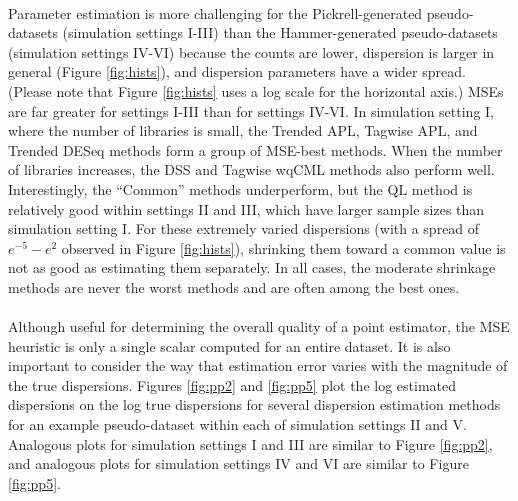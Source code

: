 \documentclass[10pt]{article}
\begin{document}
\paragraph{} \indent Parameter estimation is more challenging for the Pickrell-generated pseudo-datasets (simulation settings I-III) than the Hammer-generated pseudo-datasets (simulation settings IV-VI) because the counts are lower, dispersion is larger in general (Figure \ref{fig:hists}), and dispersion parameters have a wider spread. (Please note that Figure \ref{fig:hists} uses a log scale for the horizontal axis.) MSEs are far greater for settings I-III than for settings IV-VI. In simulation setting I, where the number of libraries is small, the Trended APL, Tagwise APL, and Trended DESeq methods form a group of MSE-best methods. When the number of libraries increases, the DSS and Tagwise wqCML methods also perform well. Interestingly, the ``Common'' methods underperform, but the QL method is relatively good within settings II and III, which have larger sample sizes than simulation setting I. For these extremely varied dispersions (with a spread of $e^{-5}-e^2$ observed in Figure \ref{fig:hists}), shrinking them toward a common value is not as good as estimating them separately. In all cases, the moderate shrinkage methods are never the worst methods and are often among the best ones.


\paragraph{} \indent Although useful for determining the overall quality of a point estimator, the MSE heuristic is only a single scalar computed for an entire dataset. It is also important to consider the way that estimation error varies with the magnitude of the true dispersions. Figures \ref{fig:pp2} and \ref{fig:pp5} plot the log estimated dispersions on the log true dispersions for several dispersion estimation methods for an example pseudo-dataset within each of simulation settings II and V. Analogous plots for simulation settings I and III are similar to Figure \ref{fig:pp2}, and analogous plots for simulation settings IV and VI are similar to Figure \ref{fig:pp5}. 
\end{document}

